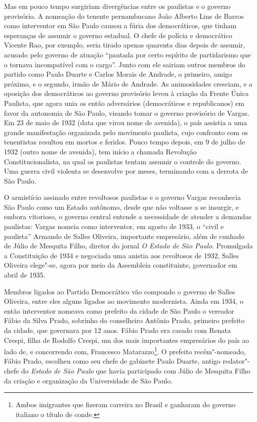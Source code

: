 Mas em pouco tempo surgiriam divergências entre os paulistas e o governo
provisório. A nomeação do tenente pernambucano João Alberto Lins de
Barros como interventor em São Paulo causou a fúria dos democráticos,
que tinham esperanças de assumir o governo estadual. O chefe de polícia
e democrático Vicente Rao, por exemplo, seria tirado apenas quarenta
dias depois de assumir, acusado pelo governo de atuação ``pautada por
certo espírito de partidarismo que o tornava incompatível com o cargo''.
Junto com ele sairiam outros membros do partido como Paulo Duarte e
Carlos Morais de Andrade, o primeiro, amigo próximo, e o segundo, irmão
de Mário de Andrade. As animosidades cresciam, e a oposição dos
democráticos ao governo provisório levou à criação da Frente Única
Paulista, que agora unia os então adversários (democráticos e
republicanos) em favor da autonomia de São Paulo, visando tomar o
governo provisório de Vargas. Em 23 de maio de 1932 (data que virou nome
de avenida), o país assistia a uma grande manifestação organizada pelo
movimento paulista, cujo confronto com os tenentistas resultou em mortos
e feridos. Pouco tempo depois, em 9 de julho de 1932 (outro nome de
avenida), tem início a chamada Revolução Constitucionalista, na qual os
paulistas tentam assumir o controle do governo. Uma guerra civil
violenta se desenvolve por meses, terminando com a derrota de São Paulo.

O armistício assinado entre revoltosos paulistas e o governo Vargas
reconhecia São Paulo como um Estado autônomo, desde que não voltasse a
se insurgir, e embora vitorioso, o governo central entende a necessidade
de atender a demandas paulistas: Vargas nomeia como interventor, em
agosto de 1933, o ``civil e paulista'' Armando de Salles Oliveira,
importante empresário, além de cunhado de Júlio de Mesquita Filho,
diretor do jornal \emph{O Estado de São Paulo}. Promulgada a
Constituição de 1934 e negociada uma anistia aos revoltosos de 1932,
Salles Oliveira elege"-se, agora por meio da Assembleia constituinte,
governador em abril de 1935.

Membros ligados ao Partido Democrático vão compondo o governo de Salles
Oliveira, entre eles alguns ligados ao movimento modernista. Ainda em
1934, o então interventor nomeava como prefeito da cidade de São Paulo o
vereador Fábio da Silva Prado, sobrinho do conselheiro Antônio Prado,
primeiro prefeito da cidade, que governara por 12 anos. Fábio Prado era
casado com Renata Crespi, filha de Rodolfo Crespi, um dos mais
importantes empresários do país ao lado de, e concorrendo com, Francesco
Matarazzo\footnote{Ambos imigrantes que fizeram carreira no Brasil e
  ganharam do governo italiano o título de conde.}. O prefeito
recém"-nomeado, Fábio Prado, escolheu como seu chefe de gabinete Paulo
Duarte, antigo redator"-chefe do \emph{Estado de São Paulo} que havia
participado com Júlio de Mesquita Filho da criação e organização da
Universidade de São Paulo.

